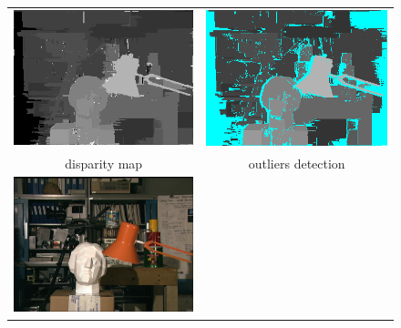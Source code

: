 \documentclass{article}
\begin{document}
\begin{figure}[h]
\begin{center}	
\begin{tabular}{cc}
\includegraphics[scale=0.5]{Images/ADCensus_aggregated_so/disparity_map.png} &
\includegraphics[scale=0.5]{Images/ADCensus_aggregated_so/disparity_occlusion.png} \\
disparity map & outliers detection \\
\includegraphics[scale=0.5]{Images/tsukuba.png} &

\end{tabular}
\end{center}
\end{figure}
\end{document}
